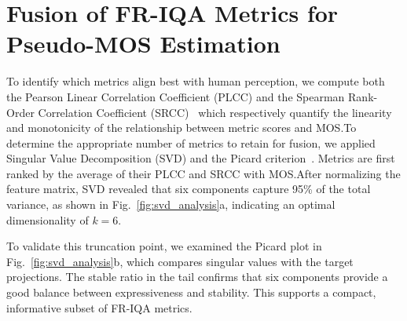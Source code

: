 \section{Fusion of FR-IQA Metrics for Pseudo-MOS Estimation}

To identify which metrics align best with human perception, we compute both the Pearson Linear Correlation Coefficient (PLCC) and the Spearman Rank-Order Correlation Coefficient (SRCC)~\cite{plcc-srcc} which respectively quantify the linearity and monotonicity of the relationship between metric scores and MOS.\@ To determine the appropriate number of metrics to retain for fusion, we applied Singular Value Decomposition (SVD) and the Picard criterion~\cite{hansen1998picard}. Metrics are first ranked by the average of their PLCC and SRCC with MOS.\@ After normalizing the feature matrix, SVD revealed that six components capture 95\% of the total variance, as shown in Fig.~\ref{fig:svd_analysis}a, indicating an optimal dimensionality of $k=6$.

To validate this truncation point, we examined the Picard plot in Fig.~\ref{fig:svd_analysis}b, which compares singular values with the target projections. The stable ratio in the tail confirms that six components provide a good balance between expressiveness and stability. This supports a compact, informative subset of FR-IQA metrics.

